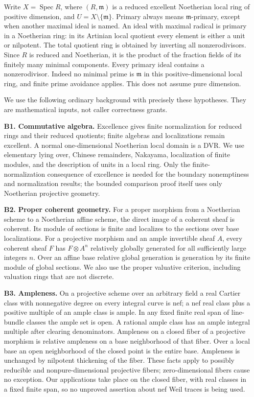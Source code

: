 \documentclass[11pt]{article}
\begin{document}
Write \(X=\operatorname{Spec}R\), where \((R,\mathfrak m)\) is a reduced excellent Noetherian local ring of positive dimension, and \(U=X\setminus\{\mathfrak m\}\). Primary always means \(\mathfrak m\)-primary, except when another maximal ideal is named. An ideal with maximal radical is primary in a Noetherian ring: in its Artinian local quotient every element is either a unit or nilpotent. The total quotient ring is obtained by inverting all nonzerodivisors. Since \(R\) is reduced and Noetherian, it is the product of the fraction fields of its finitely many minimal components. Every primary ideal contains a nonzerodivisor. Indeed no minimal prime is \(\mathfrak m\) in this positive-dimensional local ring, and finite prime avoidance applies. This does not assume pure dimension.

We use the following ordinary background with precisely these hypotheses. They are mathematical inputs, not caller correctness grants.

\textbf{B1. Commutative algebra.} Excellence gives finite normalization for reduced rings and their reduced quotients; finite algebras and localizations remain excellent. A normal one-dimensional Noetherian local domain is a DVR. We use elementary lying over, Chinese remainders, Nakayama, localization of finite modules, and the description of units in a local ring. Only the finite-normalization consequence of excellence is needed for the boundary nonemptiness and normalization results; the bounded comparison proof itself uses only Noetherian projective geometry.

\textbf{B2. Proper coherent geometry.} For a proper morphism from a Noetherian scheme to a Noetherian affine scheme, the direct image of a coherent sheaf is coherent. Its module of sections is finite and localizes to the sections over base localizations. For a projective morphism and an ample invertible sheaf \(A\), every coherent sheaf \(F\) has \(F\otimes A^n\) relatively globally generated for all sufficiently large integers \(n\). Over an affine base relative global generation is generation by its finite module of global sections. We also use the proper valuative criterion, including valuation rings that are not discrete.

\textbf{B3. Ampleness.} On a projective scheme over an arbitrary field a real Cartier class with nonnegative degree on every integral curve is nef; a nef real class plus a positive multiple of an ample class is ample. In any fixed finite real span of line-bundle classes the ample set is open. A rational ample class has an ample integral multiple after clearing denominators. Ampleness on a closed fiber of a projective morphism is relative ampleness on a base neighborhood of that fiber. Over a local base an open neighborhood of the closed point is the entire base. Ampleness is unchanged by nilpotent thickening of the fiber. These facts apply to possibly reducible and nonpure-dimensional projective fibers; zero-dimensional fibers cause no exception. Our applications take place on the closed fiber, with real classes in a fixed finite span, so no unproved assertion about nef Weil traces is being used.
\end{document}
